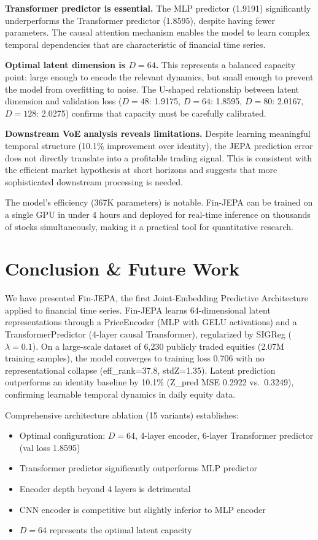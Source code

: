 \documentclass[11pt]{article}
\begin{document}
\textbf{Transformer predictor is essential.} The MLP predictor (1.9191) significantly underperforms the Transformer predictor (1.8595), despite having fewer parameters. The causal attention mechanism enables the model to learn complex temporal dependencies that are characteristic of financial time series.

\textbf{Optimal latent dimension is $D=64$.} This represents a balanced capacity point: large enough to encode the relevant dynamics, but small enough to prevent the model from overfitting to noise. The U-shaped relationship between latent dimension and validation loss ($D=48$: 1.9175, $D=64$: 1.8595, $D=80$: 2.0167, $D=128$: 2.0275) confirms that capacity must be carefully calibrated.

\textbf{Downstream VoE analysis reveals limitations.} Despite learning meaningful temporal structure (10.1\% improvement over identity), the JEPA prediction error does not directly translate into a profitable trading signal. This is consistent with the efficient market hypothesis at short horizons and suggests that more sophisticated downstream processing is needed.

The model's efficiency (367K parameters) is notable. Fin-JEPA can be trained on a single GPU in under 4 hours and deployed for real-time inference on thousands of stocks simultaneously, making it a practical tool for quantitative research.

\section{Conclusion \& Future Work}

We have presented Fin-JEPA, the first Joint-Embedding Predictive Architecture applied to financial time series. Fin-JEPA learns 64-dimensional latent representations through a PriceEncoder (MLP with GELU activations) and a TransformerPredictor (4-layer causal Transformer), regularized by SIGReg ($\lambda=0.1$). On a large-scale dataset of 6,230 publicly traded equities (2.07M training samples), the model converges to training loss 0.706 with no representational collapse (eff\_rank=37.8, stdZ=1.35). Latent prediction outperforms an identity baseline by 10.1\% (Z\_pred MSE 0.2922 vs.\ 0.3249), confirming learnable temporal dynamics in daily equity data.

Comprehensive architecture ablation (15 variants) establishes:
\begin{itemize}[nosep]
  \item Optimal configuration: $D=64$, 4-layer encoder, 6-layer Transformer predictor (val loss 1.8595)
  \item Transformer predictor significantly outperforms MLP predictor
  \item Encoder depth beyond 4 layers is detrimental
  \item CNN encoder is competitive but slightly inferior to MLP encoder
  \item $D=64$ represents the optimal latent capacity
\end{itemize}
\end{document}
